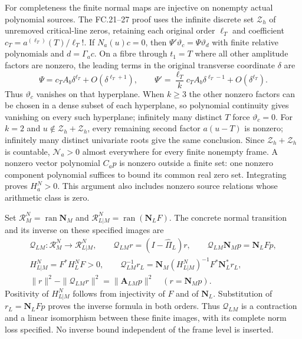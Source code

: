 \documentclass[11pt]{article}
\newcommand{\ran}{\operatorname{ran}}
\begin{document}
For completeness the finite normal maps are injective on nonempty
actual polynomial sources. The FC.21--27 proof uses the infinite
discrete set $\mathcal Z_h$ of unremoved critical-line zeros,
retaining each original order $\ell_T$ and coefficient
$c_T=a^{(\ell_T)}(T)/\ell_T!$. If $N_a(u)c=0$, then
$\Psi'\vartheta_c=\Psi\vartheta_d$ with finite relative
polynomials and $d=\Gamma_ac$. On a fibre through $t_1=T$
where all other amplitude factors are nonzero, the leading
terms in the original transverse coordinate $\delta$ are
\[
 \Psi=c_TA_b\delta^{\ell_T}+O(\delta^{\ell_T+1}),\qquad
 \Psi'=\frac{\ell_T}{k}c_TA_b\delta^{\ell_T-1}
                                      +O(\delta^{\ell_T}).
 \tag{NT.17}
\]
Thus $\vartheta_c$ vanishes on that hyperplane. When $k\ge3$
the other nonzero factors can be chosen in a dense subset of each
hyperplane, so polynomial continuity gives vanishing on every such
hyperplane; infinitely many distinct $T$ force $\vartheta_c=0$.
For $k=2$ and $u\notin\mathcal Z_h+\mathcal Z_h$, every
remaining second factor $a(u-T)$ is nonzero; infinitely many
distinct univariate roots give the same conclusion. Since
$\mathcal Z_h+\mathcal Z_h$ is countable, $\mathcal N_a>0$
almost everywhere for every finite nonempty frame. A nonzero
vector polynomial $C_ap$ is nonzero outside a finite set: one
nonzero component polynomial suffices to bound its common real
zero set. Integrating proves $H_a^N>0$. This argument also
includes nonzero source relations whose arithmetic class is zero.

Set $\mathscr R_M^N=\ran\mathbf N_M$ and
$\mathscr R_{L|M}^N=\ran(\mathbf N_LF)$. The concrete normal
transition and its inverse on these specified images are
\[
 \begin{gathered}
 \mathcal Q_{LM}:\mathscr R_M^N\longrightarrow\mathscr R_{L|M}^N,
 \qquad \mathcal Q_{LM}r=(I-\widehat\Pi_L)r,\qquad
 \mathcal Q_{LM}\mathbf N_Mp=\mathbf N_LFp,\\
 H_{L|M}^N=F^*H_L^NF>0,\qquad
 \mathcal Q_{LM}^{-1}r_L
      =\mathbf N_M(H_{L|M}^N)^{-1}F^*\mathbf N_L^*r_L,\\
 \|r\|^2-\|\mathcal Q_{LM}r\|^2
       =\|\mathbf A_{LM}p\|^2\quad(r=\mathbf N_Mp).
 \end{gathered}
 \tag{NT.18}
\]
Positivity of $H_{L|M}^N$ follows from injectivity of $F$ and
of $\mathbf N_L$. Substitution of $r_L=\mathbf N_LFp$
proves the inverse formula in both orders. Thus $\mathcal Q_{LM}$
is a contraction and a linear isomorphism between these finite
images, with its complete norm loss specified. No inverse bound
independent of the frame level is inserted.
\end{document}
